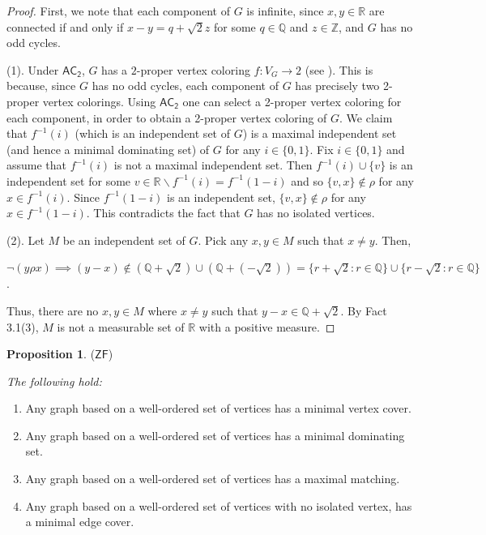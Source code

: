\documentclass[12pt,reqno,a4paper]{amsart}
\theoremstyle{definition}
\newtheorem{prop}[defn]{Proposition}
\begin{document}
	\begin{proof}
		First, we note that each component of $G$ is infinite, since $x,y\in \mathbb{R}$ are connected if and only if $x-y=q+\sqrt{2}z$ for some $q\in\mathbb{Q}$ and $z\in\mathbb{Z}$, and $G$ has no odd cycles. 
		
		(1). Under $\mathsf{AC_{2}}$, $G$ has a $2$-proper vertex coloring $f:V_{G}\rightarrow 2$ (see \cite{HR2005}). This is
		because, since $G$ has no odd cycles, each component of $G$ has precisely two 2-proper vertex colorings. Using $\mathsf{AC_{2}}$ one can select a 2-proper vertex coloring for each component, in order to obtain a 2-proper vertex coloring of $G$.
		We claim that $f^{-1}(i)$ (which is an independent set of $G$) is a maximal independent set (and hence a minimal dominating set) of $G$ for any $i\in \{0,1\}$. Fix $i\in \{0,1\}$ and assume that $f^{-1}(i)$ is not a maximal independent set. Then $f^{-1}(i)\cup \{v\}$ is an independent set for some $v\in \mathbb{R}\backslash f^{-1}(i)=f^{-1}(1-i)$ and so $\{v,x\}\not\in\rho$ for any $x\in f^{-1}(i)$. Since $f^{-1}(1-i)$ is an independent set, $\{v,x\}\not\in\rho$ for any $x\in f^{-1}(1-i)$. This contradicts the fact that $G$ has no isolated vertices. 
		
		(2). Let $M$ be an independent set of $G$. 
		Pick any $x,y\in M$ such that $x\neq y$. Then,
		
		\begin{center}
			$\neg(y\rho x)\implies (y-x)\not\in (\mathbb{Q}+\sqrt{2})\cup (\mathbb{Q}+(-\sqrt{2}))=\{r+\sqrt{2}:r\in\mathbb{Q}\}\cup\{r-\sqrt{2}:r\in\mathbb{Q}\}$.
		\end{center}
		
		Thus, there are no $x,y\in M$ where $x\neq y$ such that $y-x\in \mathbb{Q}+\sqrt{2}$. 
		By Fact 3.1(3), $M$ is not a measurable set of $\mathbb{R}$ with a positive measure. 
	\end{proof}
	
	
	\begin{prop}{($\mathsf{ZF}$)}
		{\em The following hold: 
			\begin{enumerate}
				\item Any graph based on a well-ordered set of vertices has a minimal vertex cover.
				
				\item Any graph based on a well-ordered set of vertices has a minimal dominating set.  
				
				\item Any graph based on a well-ordered set of vertices has a maximal matching.
				
				\item Any graph based on a well-ordered set of vertices with no isolated vertex, has a minimal edge cover.
			\end{enumerate}
		}
	\end{prop}
	
\end{document}
